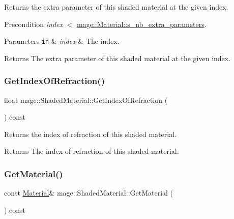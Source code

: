 Returns the extra parameter of this shaded material at the given index.

\begin{DoxyPrecond}{Precondition}
{\itshape index} {\ttfamily $<$} \hyperlink{structmage_1_1_material_ab8d10c2cb8ab77bee18654e63acaa63a}{mage\+::\+Material\+::s\+\_\+nb\+\_\+extra\+\_\+parameters}. 
\end{DoxyPrecond}

\begin{DoxyParams}[1]{Parameters}
\mbox{\tt in}  & {\em index} & The index. \\
\hline
\end{DoxyParams}
\begin{DoxyReturn}{Returns}
The extra parameter of this shaded material at the given index. 
\end{DoxyReturn}
\hypertarget{structmage_1_1_shaded_material_a4078cfbed3a919214428ab01d991b589}{}\label{structmage_1_1_shaded_material_a4078cfbed3a919214428ab01d991b589} 
\subsubsection{\texorpdfstring{Get\+Index\+Of\+Refraction()}{GetIndexOfRefraction()}}
{\footnotesize\ttfamily float mage\+::\+Shaded\+Material\+::\+Get\+Index\+Of\+Refraction (\begin{DoxyParamCaption}{ }\end{DoxyParamCaption}) const\hspace{0.3cm}{\ttfamily [noexcept]}}

Returns the index of refraction of this shaded material.

\begin{DoxyReturn}{Returns}
The index of refraction of this shaded material. 
\end{DoxyReturn}
\hypertarget{structmage_1_1_shaded_material_a4de9a6fe5389da19cbe3e5b073622374}{}\label{structmage_1_1_shaded_material_a4de9a6fe5389da19cbe3e5b073622374} 
\subsubsection{\texorpdfstring{Get\+Material()}{GetMaterial()}}
{\footnotesize\ttfamily const \hyperlink{structmage_1_1_material}{Material}\& mage\+::\+Shaded\+Material\+::\+Get\+Material (\begin{DoxyParamCaption}{ }\end{DoxyParamCaption}) const\hspace{0.3cm}{\ttfamily [noexcept]}}


